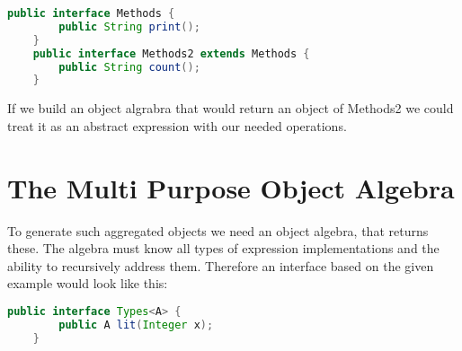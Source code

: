 \documentclass{report}
\begin{document}
\begin{lstlisting}[language=java]
    public interface Methods { 
        public String print();
    }
    public interface Methods2 extends Methods { 
        public String count();
    }
\end{lstlisting}

If we build an object algrabra that would return an object of Methods2 we could treat it as an abstract expression with our needed operations.

\section{The Multi Purpose Object Algebra}

To generate such aggregated objects we need an object algebra, that returns these. The algebra must know all types of expression implementations and the ability to recursively address them. Therefore an interface based on the given example would look like this:

\begin{lstlisting}[language=java]
    public interface Types<A> { 
        public A lit(Integer x);
    }
\end{lstlisting}
\end{document}
